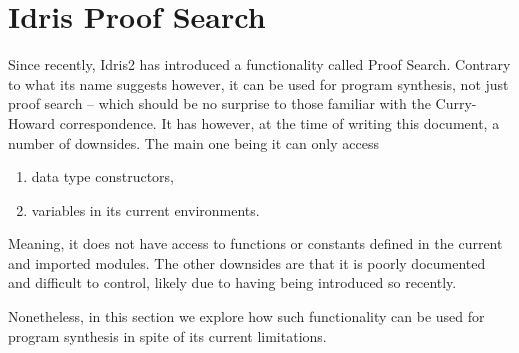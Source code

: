 \documentclass[]{report}
\begin{document}
\section{Idris Proof Search}
Since recently, Idris2 has introduced a functionality called Proof
Search.  Contrary to what its name suggests however, it can be used
for program synthesis, not just proof search -- which should be no
surprise to those familiar with the Curry-Howard correspondence.  It
has however, at the time of writing this document, a number of
downsides.  The main one being it can only access
\begin{enumerate}
\item data type constructors,
\item variables in its current environments.
\end{enumerate}
Meaning, it does not have access to functions or constants defined in
the current and imported modules.  The other downsides are that it is
poorly documented and difficult to control, likely due to having being
introduced so recently.

Nonetheless, in this section we explore how such functionality can be
used for program synthesis in spite of its current limitations.


\end{document}
